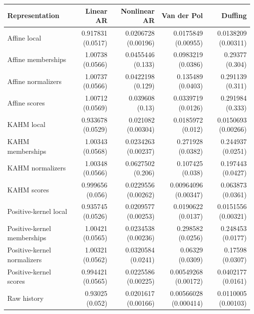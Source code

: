 \begin{tabular}{lrrrr}
\toprule
Representation & Linear AR & Nonlinear AR & Van der Pol & Duffing \\
\midrule
Affine local & 0.917831 (0.0517) & 0.0206728 (0.00196) & 0.0175849 (0.00955) & 0.0138209 (0.00311) \\
Affine memberships & 1.00738 (0.0566) & 0.0455446 (0.133) & 0.0983219 (0.0386) & 0.29377 (0.304) \\
Affine normalizers & 1.00737 (0.0566) & 0.0422198 (0.129) & 0.135489 (0.0403) & 0.291139 (0.311) \\
Affine scores & 1.00712 (0.0569) & 0.039608 (0.13) & 0.0339719 (0.0126) & 0.291984 (0.333) \\
KAHM local & 0.933678 (0.0529) & 0.021082 (0.00304) & 0.0185972 (0.012) & 0.0150693 (0.00266) \\
KAHM memberships & 1.00343 (0.0568) & 0.0234263 (0.00237) & 0.271928 (0.0382) & 0.244937 (0.0251) \\
KAHM normalizers & 1.00348 (0.0566) & 0.0627502 (0.206) & 0.107425 (0.038) & 0.197443 (0.0427) \\
KAHM scores & 0.999656 (0.056) & 0.0229556 (0.00262) & 0.00964096 (0.00347) & 0.063873 (0.0361) \\
Positive-kernel local & 0.935745 (0.0526) & 0.0209577 (0.00253) & 0.0190622 (0.0137) & 0.0151556 (0.00321) \\
Positive-kernel memberships & 1.00421 (0.0565) & 0.0234538 (0.00236) & 0.298582 (0.0256) & 0.248453 (0.0177) \\
Positive-kernel normalizers & 1.00321 (0.0562) & 0.0320584 (0.0241) & 0.06329 (0.0309) & 0.17598 (0.0307) \\
Positive-kernel scores & 0.994421 (0.0565) & 0.0225586 (0.00225) & 0.00549268 (0.00172) & 0.0402177 (0.0161) \\
Raw history & 0.93025 (0.052) & 0.0201617 (0.00166) & 0.00566028 (0.000414) & 0.0110005 (0.00103) \\
\bottomrule
\end{tabular}
